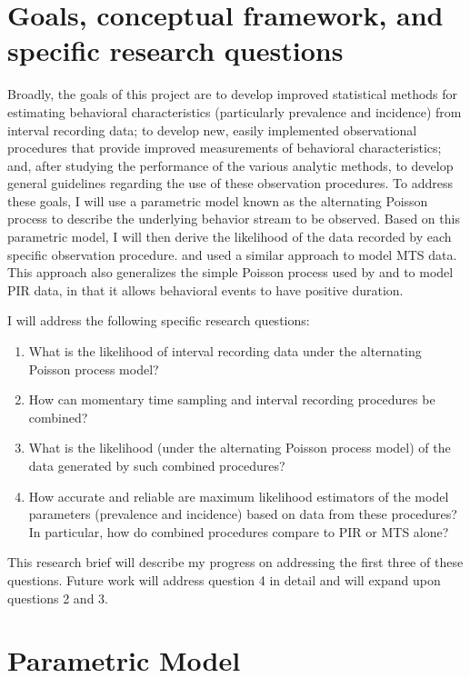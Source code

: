 \documentclass[11pt]{article}
\begin{document}
\section{Goals, conceptual framework, and specific research questions}

Broadly, the goals of this project are to develop improved statistical methods for estimating behavioral characteristics (particularly prevalence and incidence) from interval recording data; to develop new, easily implemented observational procedures that provide improved measurements of behavioral characteristics; and, after studying the performance of the various analytic methods, to develop general guidelines regarding the use of these observation procedures. To address these goals, I will use a parametric model known as the alternating Poisson process to describe the underlying behavior stream to be observed. Based on this parametric model, I will then derive the likelihood of the data recorded by each specific observation procedure. \citet{Brown1977estimation} and \citet{Griffin1983parametric} used a similar approach to model MTS data. This approach also generalizes the simple Poisson process used by \citet{Altmann1970estimating} and \citet{Fienberg1972on} to model PIR data, in that it allows behavioral events to have positive duration. 

I will address the following specific research questions:
\begin{enumerate}
\item What is the likelihood of interval recording data under the alternating Poisson process model? 
\item How can momentary time sampling and interval recording procedures be combined?
\item What is the likelihood (under the alternating Poisson process model) of the data generated by such combined procedures? 
\item How accurate and reliable are maximum likelihood estimators of the model parameters (prevalence and incidence) based on data from these procedures? In particular, how do combined procedures compare to PIR or MTS alone?
\end{enumerate}
This research brief will describe my progress on addressing the first three of these questions. Future work will address question 4 in detail and will expand upon questions 2 and 3. 

\section{Parametric Model}
\label{sec:model}
\end{document}
